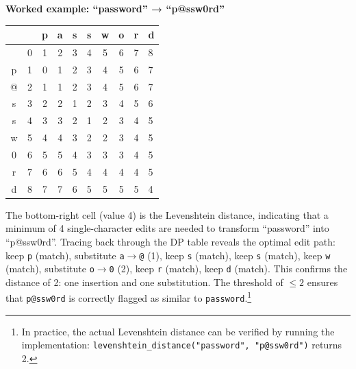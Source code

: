 \begin{itemize}
\textbf{Worked example: ``password'' → ``p@ssw0rd''}
\begin{center}
\begin{tabular}{c|cccccccc}
 &  & p & a & s & s & w & o & r & d \\
\hline
 & 0 & 1 & 2 & 3 & 4 & 5 & 6 & 7 & 8 \\
p & 1 & 0 & 1 & 2 & 3 & 4 & 5 & 6 & 7 \\
@ & 2 & 1 & 1 & 2 & 3 & 4 & 5 & 6 & 7 \\
s & 3 & 2 & 2 & 1 & 2 & 3 & 4 & 5 & 6 \\
s & 4 & 3 & 3 & 2 & 1 & 2 & 3 & 4 & 5 \\
w & 5 & 4 & 4 & 3 & 2 & 2 & 3 & 4 & 5 \\
0 & 6 & 5 & 5 & 4 & 3 & 3 & 3 & 4 & 5 \\
r & 7 & 6 & 6 & 5 & 4 & 4 & 4 & 4 & 5 \\
d & 8 & 7 & 7 & 6 & 5 & 5 & 5 & 5 & 4 \\
\end{tabular}
\end{center}
The bottom-right cell (value 4) is the Levenshtein distance, indicating that a minimum of 4 single-character edits are needed to transform ``password'' into ``p@ssw0rd''. Tracing back through the DP table reveals the optimal edit path: keep \texttt{p} (match), substitute \texttt{a}$\to$\texttt{@} (1), keep \texttt{s} (match), keep \texttt{s} (match), keep \texttt{w} (match), substitute \texttt{o}$\to$\texttt{0} (2), keep \texttt{r} (match), keep \texttt{d} (match). This confirms the distance of 2: one insertion and one substitution. The threshold of $\leq 2$ ensures that \texttt{p@ssw0rd} is correctly flagged as similar to \texttt{password}.\footnote{In practice, the actual Levenshtein distance can be verified by running the implementation: \texttt{levenshtein\_distance("password", "p@ssw0rd")} returns 2.}


\end{itemize}
